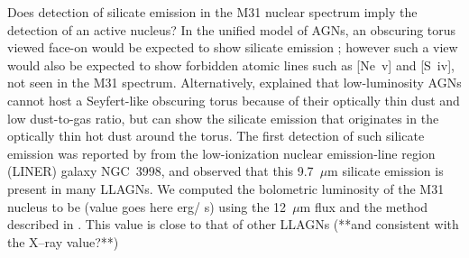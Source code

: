Does detection of silicate emission in the M31 nuclear spectrum imply the detection of an active nucleus?
In the unified model of AGNs, an obscuring torus viewed face-on would be expected to show silicate emission
\citep{AGNtypes1995, AGNref}; however such a view would also be expected to show forbidden atomic lines such as [Ne~{\sc v}] and [S~{\sc iv}],
not seen in the M31 spectrum. Alternatively, \citet{Mason2012} explained that low-luminosity AGNs cannot 
host a Seyfert-like obscuring torus because of their optically thin dust and low dust-to-gas ratio, but can show
the silicate emission that originates in the optically thin hot dust around the torus.  The first detection of such silicate emission was 
reported by \citet{Sturm2005} from the low-ionization nuclear emission-line region (LINER) galaxy NGC~3998, and 
\citealt{Mason2012}  observed that this 9.7~$\mu$m silicate emission is present in many LLAGNs. 
We computed the bolometric luminosity of the M31 nucleus  to be (value goes here erg/ s) using the 12~$\mu$m flux 
and the method described in \citet{luminosity}. This value is close to that of other LLAGNs (**and consistent with the X--ray value?**)

